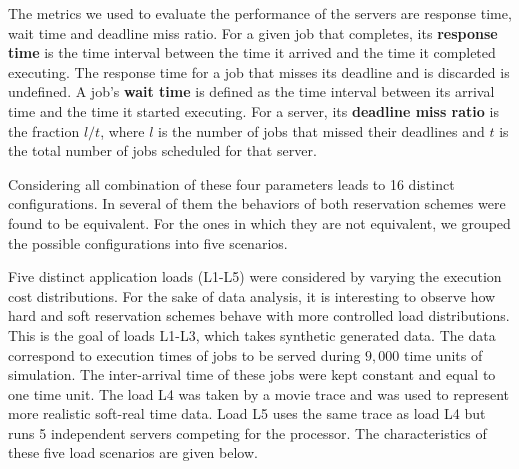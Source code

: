 \documentclass[times, 10pt,twocolumn]{article}
\begin{document}
The metrics we used to evaluate the performance of the servers are
response time, wait time and deadline miss ratio. For a given job that
completes, its \textbf{response time} is the time interval between the
time it arrived and the time it completed executing. The response time
for a job that misses its deadline and is discarded is undefined. A
job's \textbf{wait time} is defined as the time interval between its
arrival time and the time it started executing. For a server, its
\textbf{deadline miss ratio} is the fraction $l/t$, where $l$ is the
number of jobs that missed their deadlines and $t$ is the total number
of jobs scheduled for that server.

Considering all combination of these four parameters leads to 16
distinct configurations. In several of them the behaviors of both
reservation schemes were found to be equivalent.  For the ones in
which they are not equivalent, we grouped the possible configurations
into five scenarios.

\label{sec:charact-server-load}

Five distinct application loads (L1-L5) were considered by varying the
execution cost distributions.  For the sake of data analysis, it is
interesting to observe how hard and soft reservation schemes behave
with more controlled load distributions. This is the goal of loads
L1-L3, which takes synthetic generated data. The data correspond to
execution times of jobs to be served during $9,000$ time units of
simulation.  The inter-arrival time of these jobs were kept constant
and equal to one time unit.  The load L4 was taken by a movie trace
and was used to represent more realistic soft-real time data. Load L5
uses the same trace as load L4 but runs 5 independent servers
competing for the processor. The characteristics of these five load
scenarios are given below.
\end{document}
